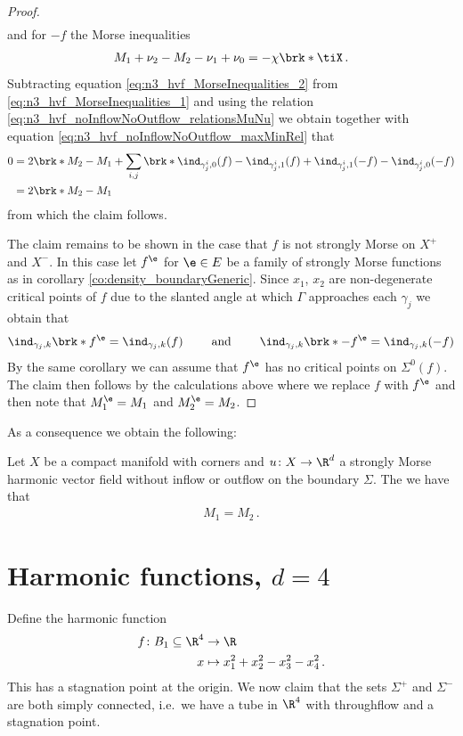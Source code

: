 \begin{proof}
\begin{align}
  \end{align}
  and for $-f$ the Morse inequalities
  \begin{align}
    M_1+\nu_2-M_2-\nu_1+\nu_0=-\chi\brk*{\tiX} \label{eq:n3_hvf_MorseInequalities_2}\,.
  \end{align}
  Subtracting equation \eqref{eq:n3_hvf_MorseInequalities_2} from \eqref{eq:n3_hvf_MorseInequalities_1} and using the relation
  \eqref{eq:n3_hvf_noInflowNoOutflow_relationsMuNu} we obtain
  together with equation \eqref{eq:n3_hvf_noInflowNoOutflow_maxMinRel} that
  \begin{align*}
    0&=2\brk*{M_2-M_1}
    +\sum_{i,j}\brk*{\ind_{\gamma_j^i,0}(f)
    -\ind_{\gamma_j^i,1}(f)
    +\ind_{\gamma_j^i,1}(-f)
    -\ind_{\gamma_j^i,0}(-f)} \\
    &=2\brk*{M_2-M_1}
  \end{align*}
  from which the claim follows.

  The claim remains to be shown in the case that $f$ is not strongly Morse on $X^+$ and $X^-$. In this case let
  $f^\e$ for $\e\in E$ be a family of strongly Morse functions as in corollary \ref{co:density_boundaryGeneric}.
  Since $x_1$, $x_2$ are non-degenerate critical points of $f$
  due to the slanted angle at which
  $\Gamma$ approaches each $\gamma_j$
  we obtain that
  \begin{align}
    \ind_{\gamma_j,k}\brk*{f^\e}=\ind_{\gamma_j,k}(f)\qquad\text{ and }\qquad 
    \ind_{\gamma_j,k}\brk*{-f^\e}=\ind_{\gamma_j,k}(-f)
    \label{eq:n3_hvf_noInflowNoOutflow_morse_indexApprox}
  \end{align}
  By the same corollary we can assume that $f^\e$ has no critical points on
  $\Sigma^0(f)$.
  The claim then follows by the calculations above where we replace
  $f$ with $f^\e$ and then note that $M_1^\e=M_1$ and $M_2^\e=M_2$.
\end{proof}

As a consequence we obtain the following:
\begin{corollary}
  Let $X$ be a compact manifold with corners and $u\colon X\to\R^d$ a strongly Morse harmonic vector field
  without inflow or outflow on the boundary $\Sigma$. The we have that
  \begin{align*}
    M_1=M_2\,.
  \end{align*}
\end{corollary}

\chapter{Harmonic functions, $d=4$} 
Define the harmonic function 
\begin{align*}
  f\colon B_1\subseteq\R^4&\to \R \\
  x &\mapsto x_1^2+x_2^2-x_3^2-x_4^2\,.
\end{align*}
This has a stagnation point at the origin. We now claim that the sets $\Sigma^+$ and $\Sigma^-$ are both simply connected, i.e.\
we have a tube in $\R^4$ with throughflow and a stagnation point.

